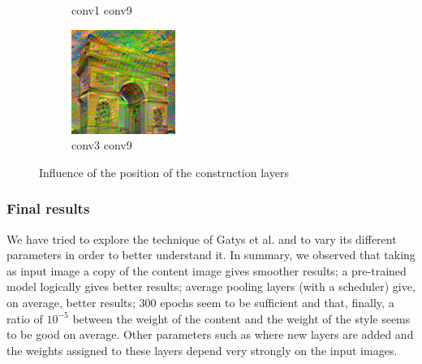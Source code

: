 \documentclass[twocolumn,superscriptaddress,aps, floatfix]{revtex4-1}
\begin{document}
\begin{figure}[ht]
\begin{subfigure}[b]{0.1\textwidth}
            \caption{conv1 conv9}
        \end{subfigure}
        \hfill
        \begin{subfigure}[b]{0.1\textwidth}
            \centering
            \includegraphics[width=\textwidth]{resources/png/layers/conv3_conv9.png}
            \caption{conv3 conv9}
        \end{subfigure}
        \caption{Influence of the position of the construction layers}
        \label{fig:added.layers}
    \end{figure}
    
    \subsubsection{Final results}
    
    We have tried to explore the technique of Gatys et al. and to vary its different parameters in order to better understand it. In summary, we observed that taking as input image a copy of the content image gives smoother results; a pre-trained model logically gives better results; average pooling layers (with a scheduler) give, on average, better results; 300 epochs seem to be sufficient and that, finally, a ratio of $10^{-5}$ between the weight of the content and the weight of the style seems to be good on average. Other parameters such as where new layers are added and the weights assigned to these layers depend very strongly on the input images.\\
    
\end{document}

